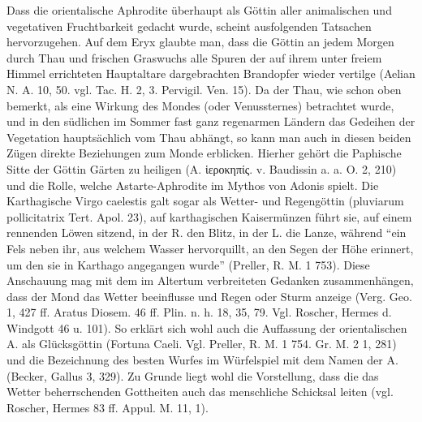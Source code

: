 \documentclass[a4paper, 11pt, oneside]{article}
\begin{document}
Dass die orientalische Aphrodite überhaupt als Göttin aller animalischen und vegetativen Fruchtbarkeit gedacht wurde, scheint ausfolgenden Tatsachen hervorzugehen. Auf dem Eryx glaubte man, dass die Göttin an jedem Morgen durch Thau und frischen Graswuchs alle Spuren der auf ihrem unter freiem Himmel errichteten Hauptaltare dargebrachten Brandopfer wieder vertilge (Aelian N. A. 10, 50. vgl. Tac. H. 2, 3. Pervigil. Ven. 15). Da der Thau, wie schon oben bemerkt, als eine Wirkung des Mondes (oder Venussternes) betrachtet wurde, und in den südlichen im Sommer fast ganz regenarmen Ländern das Gedeihen der Vegetation hauptsächlich vom Thau abhängt, so kann man auch in diesen beiden Zügen direkte Beziehungen zum Monde erblicken. Hierher gehört die Paphische Sitte der Göttin Gärten zu heiligen (Α. ἱεροκηπίς. v. Baudissin a. a. O. 2, 210) und die Rolle, welche Astarte-Aphrodite im Mythos von Adonis spielt. Die Karthagische Virgo caelestis galt sogar als Wetter- und Regengöttin (pluviarum pollicitatrix Tert. Apol. 23), auf karthagischen Kaisermünzen führt sie, auf einem rennenden Löwen sitzend, in der R. den Blitz, in der L. die Lanze, während "`ein Fels neben ihr, aus welchem Wasser hervorquillt, an den Segen der Höhe erinnert, um den sie in Karthago angegangen wurde"' (Preller, R. M. 1 753). Diese Anschauung mag mit dem im Altertum verbreiteten Gedanken zusammenhängen, dass der Mond das Wetter beeinflusse und Regen oder Sturm anzeige (Verg. Geo. 1, 427 ff. Aratus Diosem. 46 ff. Plin. n. h. 18, 35, 79. Vgl. Roscher, Hermes d. Windgott 46 u. 101). So erklärt sich wohl auch die Auffassung der orientalischen A. als Glücksgöttin (Fortuna Caeli. Vgl. Preller, R. M. 1 754. Gr. M. 2 1, 281) und die Bezeichnung des besten Wurfes im Würfelspiel mit dem Namen der A. (Becker, Gallus 3, 329). Zu Grunde liegt wohl die Vorstellung, dass die das Wetter beherrschenden Gottheiten auch das menschliche Schicksal leiten (vgl. Roscher, Hermes 83 ff. Appul. M. 11, 1).
\end{document}
